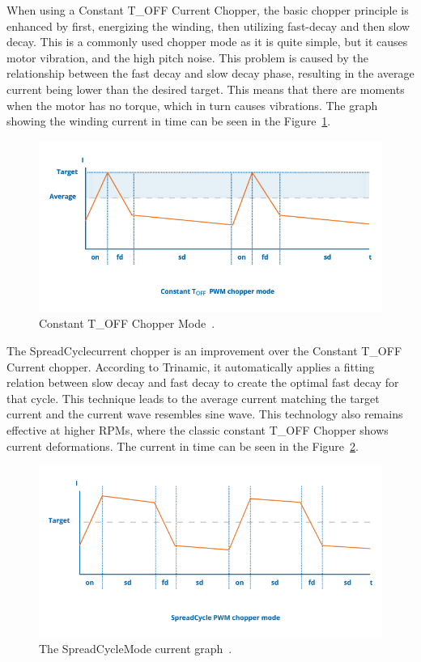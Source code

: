 When using a Constant T\_OFF Current Chopper, the basic chopper principle is enhanced by first, energizing the winding, then utilizing fast-decay and then slow decay.
This is a commonly used chopper mode as it is quite simple, but it causes motor vibration, and the high pitch noise.
This problem is caused by the relationship between the fast decay and slow decay phase, resulting in the average current being lower than the desired target.
This means that there are moments when the motor has no torque, which in turn causes vibrations\cite{trinamic_chopper_nodate}.
The graph showing the winding current in time can be seen in the Figure~\ref{fig:t_off_chopper}.

\begin{figure}[H]
    \centering
    \includegraphics[width=\textwidth]{obrazky/t_off_chopper}
    \caption{Constant T\_OFF Chopper Mode~\cite{trinamic_chopper_nodate}.}
    \label{fig:t_off_chopper}
\end{figure}

The SpreadCycle\texttrademark current chopper is an improvement over the Constant T\_OFF Current chopper.
According to Trinamic, it automatically applies a fitting relation between slow decay and fast decay to create the optimal fast decay for that cycle\cite{trinamic_chopper_nodate}.
This technique leads to the average current matching the target current and the current wave resembles sine wave.
This technology also remains effective at higher RPMs, where the classic constant T\_OFF Chopper shows current deformations\cite{trinamic_chopper_nodate}.
The current in time can be seen in the Figure~\ref{fig:spread_cycle}.

\begin{figure}[H]
    \centering
    \includegraphics[width=\textwidth]{obrazky/spread_cycle}
    \caption{The SpreadCycle\texttrademark Mode current graph~\cite{trinamic_chopper_nodate}.}
    \label{fig:spread_cycle}
\end{figure}

